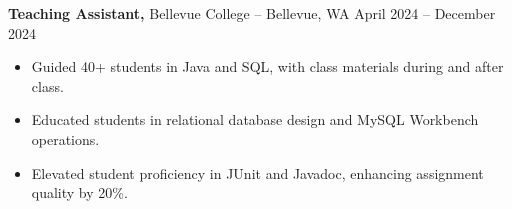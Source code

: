 \documentclass[11pt]{article}       %
\begin{document}
\textbf{Teaching Assistant,} {Bellevue College} -- Bellevue, WA \hfill April 2024 -- December 2024 \\
\vspace{-9pt}
\begin{itemize}
  \item Guided 40+ students in Java and SQL, with class materials during and after class.
  \item Educated students in relational database design and MySQL Workbench operations.
  \item Elevated student proficiency in JUnit and Javadoc, enhancing assignment quality by 20\%.
\end{itemize}

\end{document}
